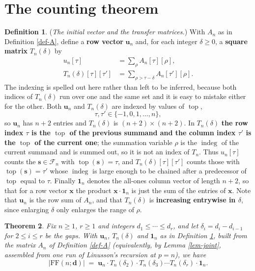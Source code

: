 \documentclass[11pt, a4paper, abstract=yes]{scrartcl}
\theoremstyle{definition}
\newtheorem{definition}{Definition}
\theoremstyle{remark}
\theoremstyle{plain}
\newtheorem{theorem}[definition]{Theorem}
\newcommand{\vek}[1]{\boldsymbol{#1}}
\newcommand{\indeg}{\operatorname{indeg}}
\newcommand{\tp}{\operatorname{top}}
\begin{document}
\section{The counting theorem}
\label{sec-main}
\begin{definition}
(\emph{The initial vector and the transfer matrices.}) With \(A_n\) as in Definition \ref{def-A}, define a
\textbf{row vector} \(\vek u_n\) and, for each integer \(\delta\ge0\), a \textbf{square matrix} \(T_n(\delta)\) by
\begin{align}
  u_n[\tau] &= \sum_{\rho}A_n[\tau][\rho],\label{eq:def-u}\\
  T_n(\delta)[\tau][\tau'] &= \sum_{\rho>\tau-\delta}A_n[\tau'][\rho].\label{eq:def-T}
\end{align}
The indexing is spelled out here rather than left to be inferred, because both indices of
\(T_n(\delta)\) run over one and the same set and it is easy to mistake either for the other. Both
\(\vek u_n\) and \(T_n(\delta)\) are indexed by values of \(\tp\),
\begin{equation}\label{eq:def-uT-range}
  \tau,\tau'\in\lbrace-1,0,1,\dots,n\rbrace ,
\end{equation}
so \(\vek u_n\) has \(n+2\) entries and \(T_n(\delta)\) is \((n+2)\times(n+2)\). In \(T_n(\delta)\) \textbf{the row
index \(\tau\) is the \(\tp\) of the previous summand and the column index \(\tau'\) is the \(\tp\) of
the current one}; the summation variable \(\rho\) is the \(\indeg\) of the current summand and is
summed out, so it is not an index of \(T_n\). Thus \(u_n[\tau]\) counts the \(\vek s\in\mathcal F_n\)
with \(\tp(\vek s)=\tau\), and \(T_n(\delta)[\tau][\tau']\) counts those with \(\tp(\vek s)=\tau'\)
whose \(\indeg\) is large enough to be chained after a predecessor of \(\tp\) equal to \(\tau\).
Finally \(\vek 1_n\) denotes the all-ones column vector of length \(n+2\), so that for a row vector
\(\vek x\) the product \(\vek x\cdot\vek 1_n\) is just the sum of the entries of \(\vek x\). Note
that \(\vek u_n\) is the row sum of
\(A_n\), and that \(T_n(\delta)\) is \textbf{increasing entrywise in \(\delta\)}, since enlarging \(\delta\)
only enlarges the range of \(\rho\).
\label{def-uT}
\end{definition}

\begin{theorem}
Fix \(n\ge1\), \(r\ge1\) and integers \(d_1\le\cdots\le d_r\), and let \(\delta_i=d_i-d_{i-1}\) for
\(2\le i\le r\) be the gaps. With \(\vek u_n\), \(T_n(\delta)\) and \(\vek 1_n\) as in
Definition \ref{def-uT}, built from the matrix \(A_n\) of Definition \ref{def-A} (equivalently, by
Lemma \ref{lem-joint}, assembled from one run of Linusson's recursion at \(p=n\)), we have
\begin{equation}\label{eq:auto-15}
  \lvert\mathrm{FF}(n;\vek d)\rvert\;=\;\vek u_n\cdot T_n(\delta_2)\cdot T_n(\delta_3)\cdots T_n(\delta_r)\cdot\vek 1_n .
\end{equation}
\label{thm-main}
\end{theorem}
\end{document}
